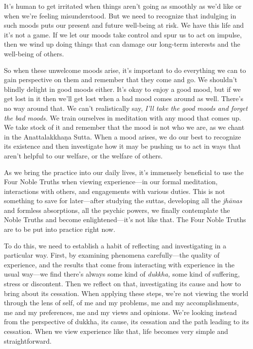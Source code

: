 It's human to get irritated when things aren't going as smoothly as 
we'd like or when we're feeling misunderstood. But we need to recognize 
that indulging in such moods puts our present and future well-being at 
risk. We have this life and it's not a game. If we let our moods take 
control and spur us to act on impulse, then we wind up doing things 
that can damage our long-term interests and the well-being of others.

So when these unwelcome moods arise, it's important to do everything we 
can to gain perspective on them and remember that they come and go. We 
shouldn't blindly delight in good moods either. It's okay to enjoy a 
good mood, but if we get lost in it then we'll get lost when a bad mood 
comes around as well. There's no way around that. We can't 
realistically say, \emph{I'll take the good moods and forget the bad 
moods.} We train ourselves in meditation with any mood that comes up. 
We take stock of it and remember that the mood is not who we are, as we 
chant in the Anattalakkhaṇa Sutta. When a mood arises, we do our best 
to recognize its existence and then investigate how it may be pushing 
us to act in ways that aren't helpful to our welfare, or the welfare of 
others.


As we bring the practice into our daily lives, it's immensely 
beneficial to use the Four Noble Truths when viewing experience---in 
our formal meditation, interactions with others, and engagements with 
various duties. This is not something to save for later---after 
studying the suttas, developing all the \emph{jhānas} and formless 
absorptions, all the psychic powers, we finally contemplate the Noble 
Truths and become enlightened---it's not like that. The Four Noble 
Truths are to be put into practice right now.

To do this, we need to establish a habit of reflecting and 
investigating in a particular way. First, by examining phenomena 
carefully---the quality of experience, and the results that come from 
interacting with experience in the usual way---we find there's always 
some kind of \emph{dukkha,} some kind of suffering, stress or 
discontent. Then we reflect on that, investigating its cause and how to 
bring about its cessation. When applying these steps, we're not viewing 
the world through the lens of self, of me and my problems, me and my 
accomplishments, me and my preferences, me and my views and opinions. 
We're looking instead from the perspective of dukkha, its cause, its 
cessation and the path leading to its cessation. When we view 
experience like that, life becomes very simple and straightforward.

